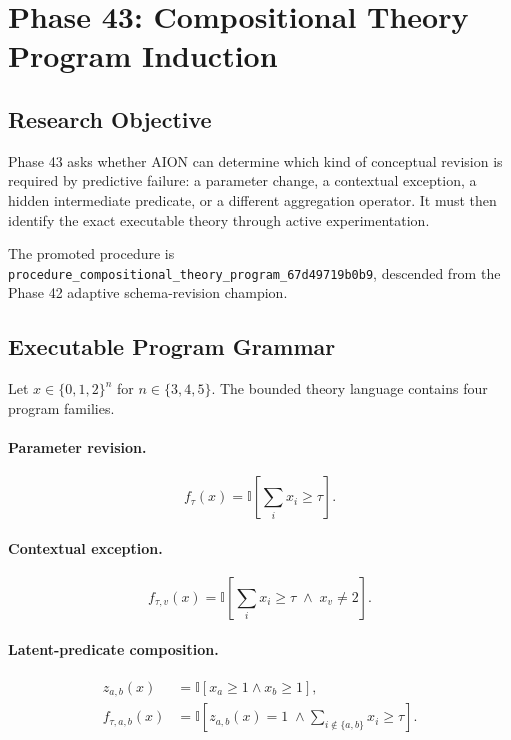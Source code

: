 \section{Phase 43: Compositional Theory Program Induction}
\label{sec:hexcore-phase43}

\subsection{Research Objective}

Phase 43 asks whether AION can determine which kind of conceptual revision is
required by predictive failure: a parameter change, a contextual exception, a
hidden intermediate predicate, or a different aggregation operator. It must
then identify the exact executable theory through active experimentation.

The promoted procedure is
\texttt{procedure\_compositional\_theory\_program\_67d49719b0b9}, descended
from the Phase 42 adaptive schema-revision champion.

\subsection{Executable Program Grammar}

Let $x\in\{0,1,2\}^{n}$ for $n\in\{3,4,5\}$. The bounded theory language
contains four program families.

\paragraph{Parameter revision.}
\begin{equation}
  f_{\tau}(x)=\mathbb{I}\!\left[\sum_i x_i\geq\tau\right].
\end{equation}

\paragraph{Contextual exception.}
\begin{equation}
  f_{\tau,v}(x)=
  \mathbb{I}\!\left[
    \sum_i x_i\geq\tau \;\land\; x_v\neq 2
  \right].
\end{equation}

\paragraph{Latent-predicate composition.}
\begin{align}
  z_{a,b}(x) &=
  \mathbb{I}[x_a\geq1 \land x_b\geq1],\\
  f_{\tau,a,b}(x) &=
  \mathbb{I}\!\left[
    z_{a,b}(x)=1 \;\land\!
    \sum_{i\notin\{a,b\}}x_i\geq\tau
  \right].
\end{align}

